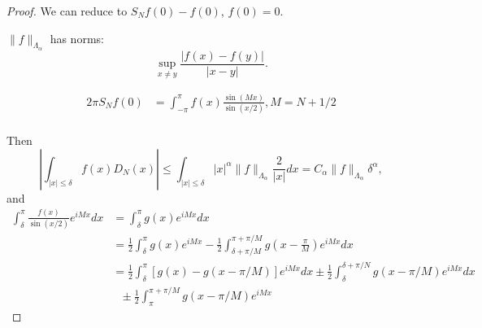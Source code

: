 \documentclass[11pt]{scrartcl}
\newcommand{\<}{\langle}
\renewcommand{\>}{\rangle}
\begin{document}
\begin{proof}
We can reduce to $S_Nf(0) - f(0)$, $f(0) = 0$.

$\|f\|_{\Lambda_\alpha}$ has norms: $$\sup_{x \ne y} \frac{|f(x) - f(y)|}{|x-y|}.$$

\begin{align*}
2\pi S_Nf(0) &=\int_{-\pi}^{\pi} f(x) \frac{\sin(Mx)}{\sin(x/2)}, M = N+1/2\\
\end{align*}

Then 
$$\left |\int_{|x| \le \delta}f(x)D_N(x)\right | \le \int_{|x| \le \delta} |x|^{\alpha}\|f\|_{\Lambda_\alpha}\frac{2}{|x|}dx = C_\alpha \|f\|_{\Lambda_\alpha}\delta^{\alpha},$$
and 
\begin{align*}
\int_{\delta}^\pi \frac{f(x)}{\sin(x/2)} e^{iMx}dx &= \int_{\delta}^\pi g(x)e^{iMx} dx\\
&= \frac{1}{2} \int_{\delta}^\pi g(x)e^{iMx} - \frac{1}{2} \int_{\delta + \pi/M}^{\pi + \pi/M} g\left (x-\frac{\pi}{M}\right )e^{iMx}dx\\
&= \frac{1}{2}\int_{\delta}^\pi [g(x) - g(x-\pi/M)]e^{iMx}dx \pm \frac{1}{2} \int_{\delta}^{\delta+\pi/N} g(x - \pi/M)e^{iMx}dx\\ &\text{               }\pm \frac{1}{2} \int_{\pi}^{\pi+\pi/M} g(x-\pi/M)e^{iMx}
\end{align*}

\end{proof}
\end{document}
